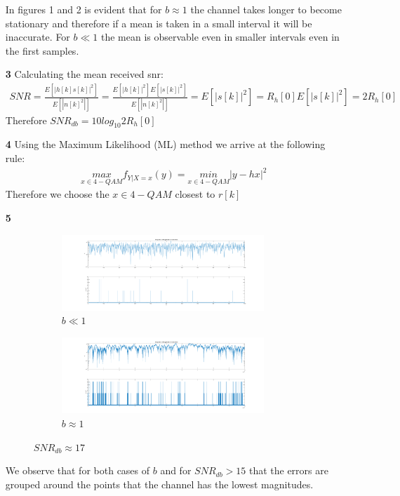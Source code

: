 \documentclass[12pt]{article}
\begin{document}
\begin{enumerate}
		In figures 1 and 2 is evident that for $b\approx1$ the channel takes longer to become stationary and therefore if a mean is taken in a small interval it will be inaccurate. For $b\ll1$ the mean is observable even in smaller intervals even in the first samples.
		\newpage
		\item[\bf 3]
		Calculating the mean received snr:
		\begin{align*}
			SNR=\frac{E[|h[k]s[k]|^2]}{E[|n[k]^2|]}=\frac{E[|h[k]|^2]E[|s[k]|^2]}{E[|n[k]^2|]}=E[|s[k]|^2]=R_h[0]E[|s[k]|^2] = 2R_h[0]
		\end{align*}
		Therefore $SNR_{db} = 10log_{10}2R_h[0]$
		
		\item[\bf 4]
		Using the Maximum Likelihood (ML) method we arrive at the following rule:
		\begin{align*}
			\underset{x\in4-QAM}{max}f_{Y|X=x}(y)=\underset{x\in4-QAM}{min}|y-hx|^2
		\end{align*}
		Therefore we choose the $x\in4-QAM$ closest to $r[k]$
		\newpage
		\item[\bf 5]
		\begin{figure}
			\centering
			\begin{subfigure}[b]{\textwidth}
				\centering
				\includegraphics[width=0.9\textwidth]{fig3.png}
				\caption{$b\ll1$}
			\end{subfigure}
			\begin{subfigure}[b]{\textwidth}
				\centering
				\includegraphics[width=0.9\textwidth]{fig3_b.png}
				\caption{$b\approx1$}
			\end{subfigure}
			\caption{$SNR_{db}\approx17$}
		\end{figure}
		We observe that for both cases of $b$ and for $SNR_{db}>15$ that the errors are grouped around the points that the channel has the lowest magnitudes.
		

\end{enumerate}
\end{document}
